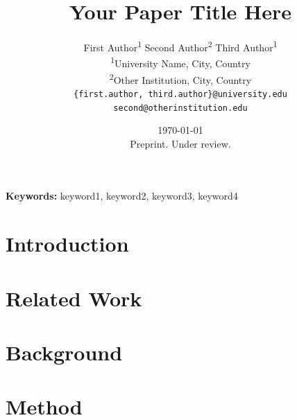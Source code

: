 \documentclass[11pt]{article}
\begin{document}

\title{\textbf{Your Paper Title Here}}

\author{
  First Author\textsuperscript{1} \quad
  Second Author\textsuperscript{2} \quad
  Third Author\textsuperscript{1}
  \\[0.5em]
  \textsuperscript{1}University Name, City, Country \\
  \textsuperscript{2}Other Institution, City, Country \\
  \texttt{\{first.author, third.author\}@university.edu} \quad
  \texttt{second@otherinstitution.edu}
}

\date{
  \today \\[0.5em]
  \small Preprint. Under review.  %
}

\maketitle

\begin{abstract}
  
\end{abstract}

\textbf{Keywords:} keyword1, keyword2, keyword3, keyword4

\tableofcontents
\newpage


\section{Introduction}
\label{sec:intro}


\section{Related Work}
\label{sec:related}


\section{Background}
\label{sec:background}


\section{Method}
\label{sec:method}

\end{document}
